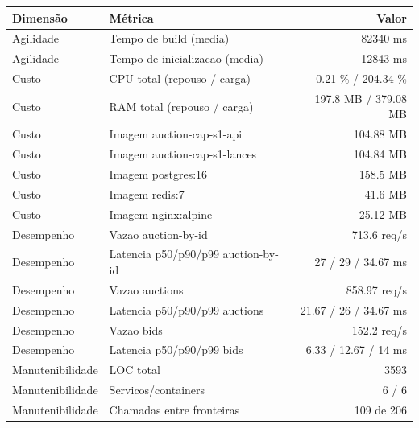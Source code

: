 \begin{quadro}[htb]
  \centering
  \caption{Métricas (auction, capacidade-negocio, snapshot-1).}
  \label{qua:metricas-auction-capacidade-negocio-snapshot-1}
  \renewcommand{\arraystretch}{1.15}
  \begin{tabular}{|l|l|r|}
    \hline
    \textbf{Dimensão} & \textbf{Métrica} & \textbf{Valor} \\
    \hline
    Agilidade & Tempo de build (media) & 82340 ms \\ \hline
    Agilidade & Tempo de inicializacao (media) & 12843 ms \\ \hline
    Custo & CPU total (repouso / carga) & 0.21 \% / 204.34 \% \\ \hline
    Custo & RAM total (repouso / carga) & 197.8 MB / 379.08 MB \\ \hline
    Custo & Imagem auction-cap-s1-api & 104.88 MB \\ \hline
    Custo & Imagem auction-cap-s1-lances & 104.84 MB \\ \hline
    Custo & Imagem postgres:16 & 158.5 MB \\ \hline
    Custo & Imagem redis:7 & 41.6 MB \\ \hline
    Custo & Imagem nginx:alpine & 25.12 MB \\ \hline
    Desempenho & Vazao auction-by-id & 713.6 req/s \\ \hline
    Desempenho & Latencia p50/p90/p99 auction-by-id & 27 / 29 / 34.67 ms \\ \hline
    Desempenho & Vazao auctions & 858.97 req/s \\ \hline
    Desempenho & Latencia p50/p90/p99 auctions & 21.67 / 26 / 34.67 ms \\ \hline
    Desempenho & Vazao bids & 152.2 req/s \\ \hline
    Desempenho & Latencia p50/p90/p99 bids & 6.33 / 12.67 / 14 ms \\ \hline
    Manutenibilidade & LOC total & 3593 \\ \hline
    Manutenibilidade & Servicos/containers & 6 / 6 \\ \hline
    Manutenibilidade & Chamadas entre fronteiras & 109 de 206 \\ \hline
  \end{tabular}
\end{quadro}
